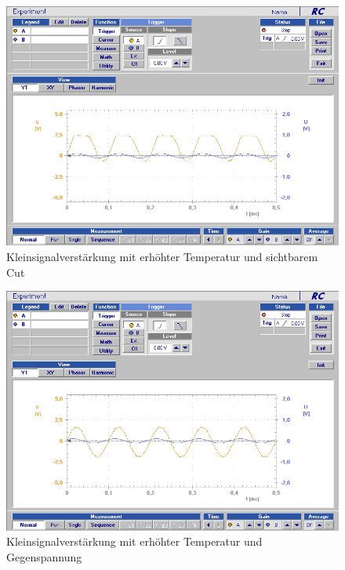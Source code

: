 \documentclass[12pt,a4paper]{article}
\begin{document}
\begin{figure}[H]
	\centering
	\includegraphics[scale=0.45]{./data/Braun_Kurz_PS8/Kleinsignalverstaerkung_Temp_Cut.png}
	\caption{Kleinsignalverstärkung mit erhöhter Temperatur und sichtbarem Cut}
	\label{fig:kleinsignalverstaerkung_temp_cut}
\end{figure}

\begin{figure}[H]
	\centering
	\includegraphics[scale=0.45]{./data/Braun_Kurz_PS8/Kleinsignalverstaerkung_Temp_Gegenspannung.png}
	\caption{Kleinsignalverstärkung mit erhöhter Temperatur und Gegenspannung}
	\label{fig:kleinsignalverstaerkung_temp_gegen}
\end{figure}
\end{document}
